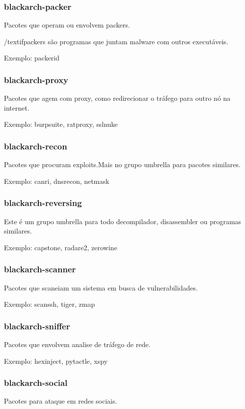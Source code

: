 \documentclass[a4paper, oneside, 11pt]{book}
\begin{document}
\subsubsection{blackarch-packer}
Pacotes que operam ou envolvem packers.

/textif{packers são programas que juntam malware com outros executáveis.}

Exemplo: packerid

\subsubsection{blackarch-proxy}
Pacotes que agem com proxy, como redirecionar o tráfego para outro nó na internet.

Exemplo: burpsuite, ratproxy, sslnuke

\subsubsection{blackarch-recon}
Pacotes que procuram exploits.Mais no grupo umbrella para pacotes similares.

Exemplo: canri, dnsrecon, netmask

\subsubsection{blackarch-reversing}
Este é um grupo umbrella para todo decompilador, disassembler ou programas similares.

Exemplo: capstone, radare2, zerowine

\subsubsection{blackarch-scanner}
Pacotes que scaneiam um sistema em busca de vulnerabilidades.

Exemplo: scanssh, tiger, zmap

\subsubsection{blackarch-sniffer}
Pacotes que envolvem analise de tráfego de rede.

Exemplo: hexinject, pytactle, xspy

\subsubsection{blackarch-social}
Pacotes para ataque em redes sociais.
\end{document}
